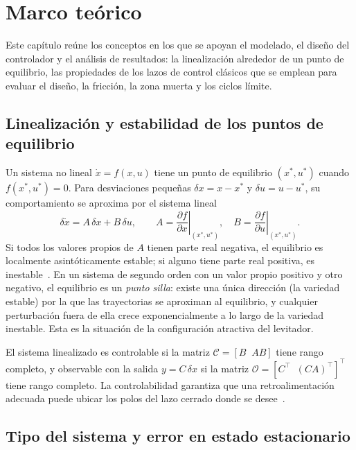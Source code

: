 \chapter{Marco teórico}\label{chap:marco}

Este capítulo reúne los conceptos en los que se apoyan el modelado, el diseño del controlador y el análisis de resultados: la linealización alrededor de un punto de equilibrio, las propiedades de los lazos de control clásicos que se emplean para evaluar el diseño, la fricción, la zona muerta y los ciclos límite.

\section{Linealización y estabilidad de los puntos de equilibrio}

Un sistema no lineal $\dot{x}=f(x,u)$ tiene un punto de equilibrio $(x^*,u^*)$ cuando $f(x^*,u^*)=0$. Para desviaciones pequeñas $\delta x = x-x^*$ y $\delta u = u-u^*$, su comportamiento se aproxima por el sistema lineal
\begin{equation}
\delta\dot{x} = A\,\delta x + B\,\delta u, \qquad
A=\left.\frac{\partial f}{\partial x}\right|_{(x^*,u^*)}, \quad
B=\left.\frac{\partial f}{\partial u}\right|_{(x^*,u^*)} .
\label{eq:linealizacion}
\end{equation}
Si todos los valores propios de $A$ tienen parte real negativa, el equilibrio es localmente asintóticamente estable; si alguno tiene parte real positiva, es inestable~\cite{khalil2}. En un sistema de segundo orden con un valor propio positivo y otro negativo, el equilibrio es un \emph{punto silla}: existe una única dirección (la variedad estable) por la que las trayectorias se aproximan al equilibrio, y cualquier perturbación fuera de ella crece exponencialmente a lo largo de la variedad inestable. Esta es la situación de la configuración atractiva del levitador.

El sistema linealizado es controlable si la matriz $\mathcal{C}=[B\;\; AB]$ tiene rango completo, y observable con la salida $y=C\,\delta x$ si la matriz $\mathcal{O}=[C^\top\;\; (CA)^\top]^\top$ tiene rango completo. La controlabilidad garantiza que una retroalimentación adecuada puede ubicar los polos del lazo cerrado donde se desee~\cite{ogata}.

\section{Tipo del sistema y error en estado estacionario}

